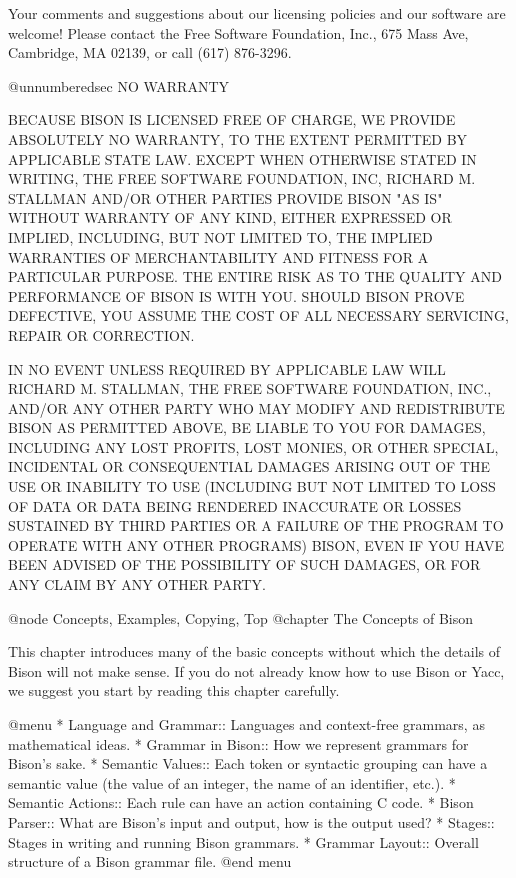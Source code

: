 Your comments and suggestions about our licensing policies and our
software are welcome!  Please contact the Free Software Foundation, Inc.,
675 Mass Ave, Cambridge, MA 02139, or call (617) 876-3296.

@unnumberedsec NO WARRANTY

  BECAUSE BISON IS LICENSED FREE OF CHARGE, WE PROVIDE ABSOLUTELY NO
WARRANTY, TO THE EXTENT PERMITTED BY APPLICABLE STATE LAW.  EXCEPT
WHEN OTHERWISE STATED IN WRITING, THE FREE SOFTWARE FOUNDATION, INC,
RICHARD M. STALLMAN AND/OR OTHER PARTIES PROVIDE BISON "AS IS" WITHOUT
WARRANTY OF ANY KIND, EITHER EXPRESSED OR IMPLIED, INCLUDING, BUT NOT
LIMITED TO, THE IMPLIED WARRANTIES OF MERCHANTABILITY AND FITNESS FOR
A PARTICULAR PURPOSE.  THE ENTIRE RISK AS TO THE QUALITY AND
PERFORMANCE OF BISON IS WITH YOU.  SHOULD BISON PROVE DEFECTIVE, YOU
ASSUME THE COST OF ALL NECESSARY SERVICING, REPAIR OR CORRECTION.

 IN NO EVENT UNLESS REQUIRED BY APPLICABLE LAW WILL RICHARD M.
STALLMAN, THE FREE SOFTWARE FOUNDATION, INC., AND/OR ANY OTHER PARTY
WHO MAY MODIFY AND REDISTRIBUTE BISON AS PERMITTED ABOVE, BE LIABLE TO
YOU FOR DAMAGES, INCLUDING ANY LOST PROFITS, LOST MONIES, OR OTHER
SPECIAL, INCIDENTAL OR CONSEQUENTIAL DAMAGES ARISING OUT OF THE USE OR
INABILITY TO USE (INCLUDING BUT NOT LIMITED TO LOSS OF DATA OR DATA
BEING RENDERED INACCURATE OR LOSSES SUSTAINED BY THIRD PARTIES OR A
FAILURE OF THE PROGRAM TO OPERATE WITH ANY OTHER PROGRAMS) BISON, EVEN
IF YOU HAVE BEEN ADVISED OF THE POSSIBILITY OF SUCH DAMAGES, OR FOR
ANY CLAIM BY ANY OTHER PARTY.

@node Concepts, Examples, Copying, Top
@chapter The Concepts of Bison

This chapter introduces many of the basic concepts without which the
details of Bison will not make sense.  If you do not already know how to
use Bison or Yacc, we suggest you start by reading this chapter carefully.

@menu
* Language and Grammar::  Languages and context-free grammars,
			    as mathematical ideas.
* Grammar in Bison::      How we represent grammars for Bison's sake.
* Semantic Values::       Each token or syntactic grouping can have
                            a semantic value (the value of an integer,
                            the name of an identifier, etc.).
* Semantic Actions::      Each rule can have an action containing C code.
* Bison Parser::          What are Bison's input and output,
                            how is the output used?
* Stages::		  Stages in writing and running Bison grammars.
* Grammar Layout::        Overall structure of a Bison grammar file.
@end menu


